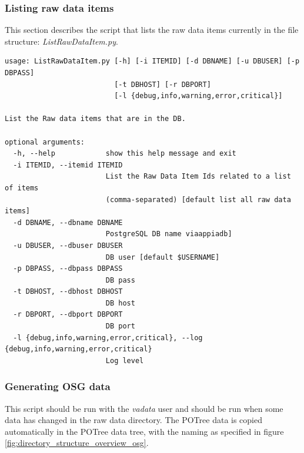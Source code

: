 \subsubsection{Listing raw data items}
\label{sec:listraw}
This section describes the script that lists the raw data items currently in the file structure: \textit{ListRawDataItem.py}.
\begin{Verbatim}[fontfamily=courier,commandchars=\\\{\},fontsize=\footnotesize]
usage: ListRawDataItem.py [-h] [-i ITEMID] [-d DBNAME] [-u DBUSER] [-p DBPASS]
                          [-t DBHOST] [-r DBPORT]
                          [-l {debug,info,warning,error,critical}]

List the Raw data items that are in the DB.

optional arguments:
  -h, --help            show this help message and exit
  -i ITEMID, --itemid ITEMID
                        List the Raw Data Item Ids related to a list of items
                        (comma-separated) [default list all raw data items]
  -d DBNAME, --dbname DBNAME
                        PostgreSQL DB name viaappiadb]
  -u DBUSER, --dbuser DBUSER
                        DB user [default $USERNAME]
  -p DBPASS, --dbpass DBPASS
                        DB pass
  -t DBHOST, --dbhost DBHOST
                        DB host
  -r DBPORT, --dbport DBPORT
                        DB port
  -l {debug,info,warning,error,critical}, --log {debug,info,warning,error,critical}
                        Log level

\end{Verbatim}

\subsubsection{Generating OSG data}
\label{sec:generateosg}
This script should be run with the \textit{vadata} user and should be run when some data has changed in the raw data directory. The POTree data is copied automatically in the POTree data tree, with the naming as specified in figure
 \ref{fig:directory_structure_overview_osg}.
 
